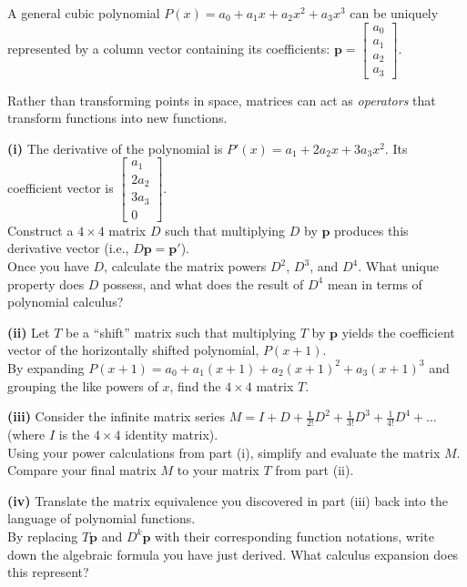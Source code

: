 \begin{problem}
A general cubic polynomial $P(x) = a_0 + a_1x + a_2x^2 + a_3x^3$ can be uniquely represented by a column vector containing its coefficients: $\mathbf{p} = \begin{bmatrix} a_0 \\ a_1 \\ a_2 \\ a_3 \end{bmatrix}$.

Rather than transforming points in space, matrices can act as \textit{operators} that transform functions into new functions.

\textbf{(i)} The derivative of the polynomial is $P'(x) = a_1 + 2a_2x + 3a_3x^2$. Its coefficient vector is $\begin{bmatrix} a_1 \\ 2a_2 \\ 3a_3 \\ 0 \end{bmatrix}$. \\
Construct a $4 \times 4$ matrix $D$ such that multiplying $D$ by $\mathbf{p}$ produces this derivative vector (i.e., $D\mathbf{p} = \mathbf{p}'$). \\
Once you have $D$, calculate the matrix powers $D^2$, $D^3$, and $D^4$. What unique property does $D$ possess, and what does the result of $D^4$ mean in terms of polynomial calculus?

\textbf{(ii)} Let $T$ be a ``shift'' matrix such that multiplying $T$ by $\mathbf{p}$ yields the coefficient vector of the horizontally shifted polynomial, $P(x+1)$. \\
By expanding $P(x+1) = a_0 + a_1(x+1) + a_2(x+1)^2 + a_3(x+1)^3$ and grouping the like powers of $x$, find the $4 \times 4$ matrix $T$.

\textbf{(iii)} Consider the infinite matrix series $M = I + D + \frac{1}{2!}D^2 + \frac{1}{3!}D^3 + \frac{1}{4!}D^4 + \dots$ (where $I$ is the $4 \times 4$ identity matrix).\\
Using your power calculations from part (i), simplify and evaluate the matrix $M$. Compare your final matrix $M$ to your matrix $T$ from part (ii).

\textbf{(iv)} Translate the matrix equivalence you discovered in part (iii) back into the language of polynomial functions. \\
By replacing $T\mathbf{p}$ and $D^k\mathbf{p}$ with their corresponding function notations, write down the algebraic formula you have just derived. What calculus expansion does this represent?
\end{problem}

